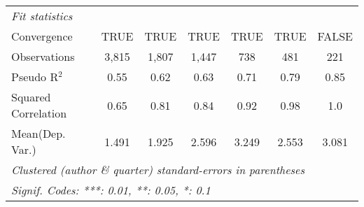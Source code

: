 \begin{tabular}{lcccccc}
   \midrule
   \emph{Fit statistics}\\
   Convergence                                                &TRUE     & TRUE         & TRUE         & TRUE      & TRUE          & FALSE\\  
   Observations                                               & 3,815   & 1,807        & 1,447        & 738       & 481           & 221\\  
   Pseudo R$^2$                                               & 0.55    & 0.62         & 0.63         & 0.71      & 0.79          & 0.85\\  
   Squared Correlation                                        & 0.65    & 0.81         & 0.84         & 0.92      & 0.98          & 1.0\\  
Mean(Dep. Var.) & 1.491 & 1.925 & 2.596 & 3.249 & 2.553 & 3.081 \\
   \midrule \midrule
   \multicolumn{7}{l}{\emph{Clustered (author \& quarter) standard-errors in parentheses}}\\
   \multicolumn{7}{l}{\emph{Signif. Codes: ***: 0.01, **: 0.05, *: 0.1}}\\
\end{tabular}
\par\endgroup
